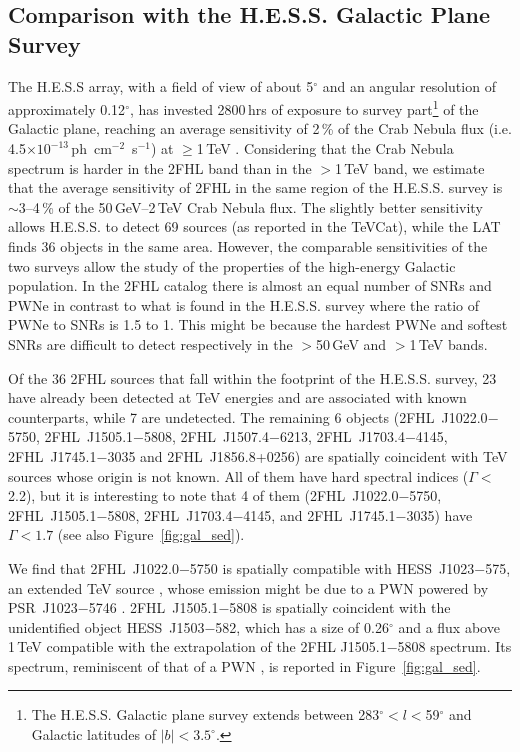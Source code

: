 {\subsection{Comparison with the H.E.S.S. Galactic Plane Survey}\label{2fhl:HESS}
The H.E.S.S array, with a field of view of about 5$^{\circ}$ and an angular resolution of approximately 0.12$^\circ$, has invested 2800\,hrs of exposure to survey  part\footnote{The H.E.S.S. Galactic plane survey extends between 283$^{\circ}<l<$59$^{\circ}$ and Galactic latitudes of $|b|<3.5^{\circ}$.} 
of the Galactic plane, reaching an average sensitivity of 2\,\% of the Crab Nebula flux (i.e. 4.5$\times10^{-13}$\,ph~cm$^{-2}$~s$^{-1}$) at $\geq$1\,TeV \citep{aharonian06_gps,carrigan2013}. Considering that the Crab Nebula spectrum is harder
in the 2FHL band than in the $>$1\,TeV band, we estimate that the average sensitivity of 2FHL in the same region of the H.E.S.S. survey is $\sim$3--4\,\% of the { 50\,GeV--2\,TeV Crab Nebula flux.} The slightly better sensitivity 
allows H.E.S.S. to detect 69 sources (as reported in the TeVCat), while
the LAT finds 36 objects in the same area. However, the comparable sensitivities of the two surveys allow the study of the  properties of the high-energy Galactic population.
In the 2FHL catalog there is almost an equal number of SNRs and PWNe
in contrast to what is found in the  H.E.S.S. survey where the ratio
of PWNe to SNRs is 1.5 to 1. This might be because
the hardest PWNe and softest SNRs { are difficult to detect} respectively
in the $>$50\,GeV and $>$1\,TeV bands.


Of the 36 2FHL sources that fall within the footprint of 
the H.E.S.S. survey, 23 have already been detected
at TeV energies and are associated with known counterparts,
while 7 are undetected. The remaining 6 objects
(2FHL~J1022.0$-$5750, 2FHL~J1505.1$-$5808,  2FHL~J1507.4$-$6213, 2FHL~J1703.4$-$4145, 2FHL~J1745.1$-$3035 and  2FHL~J1856.8+0256)
are spatially coincident with TeV sources whose origin is not known.
All of them have hard spectral indices ($\Gamma<$2.2), but
it is interesting to note that 4 of them 
(2FHL~J1022.0$-$5750, 2FHL~J1505.1$-$5808, 2FHL~J1703.4$-$4145, and 2FHL~J1745.1$-$3035)
have $\Gamma<1.7$ (see also Figure~\ref{fig:gal_sed}).

We find that 2FHL~J1022.0$-$5750 is spatially compatible with
{ HESS~J1023$-$575, an extended TeV source \citep{westerlund2_hess11},
    whose emission might be due to a PWN powered by PSR~J1023$-$5746 \citep{Acero13}. }
2FHL~J1505.1$-$5808 is spatially coincident with the unidentified
object HESS~J1503$-$582, which has a size of 0.26$^{\circ}$ and a flux above 1\,TeV \citep{renaud08} compatible with the extrapolation of the 2FHL J1505.1$-$5808 spectrum.
Its spectrum, reminiscent of that of a PWN 
\citep[\eg{}, HESS~J1825$-$137,][]{grondin2011},
 is reported in Figure~\ref{fig:gal_sed}.


}
